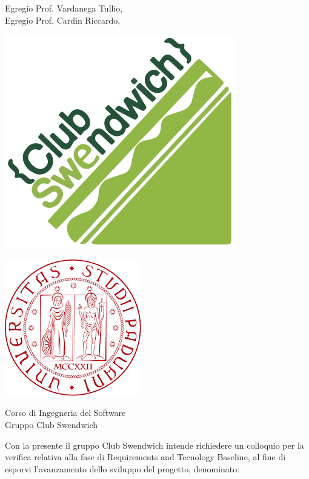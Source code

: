 \documentclass[a4paper, 12pt]{letter}
\begin{document}
    \begin{letter}
        { Egregio Prof. Vardanega Tullio,\\Egregio Prof. Cardin Riccardo,}
        \begin{minipage}{.4\textwidth}
            \begin{flushleft}
                \includegraphics[width=.55\textwidth]{../../assets/ClubSweLogo.png}
            \end{flushleft}
        \end{minipage}
        \begin{minipage}{.5\textwidth}
            \begin{flushright}
                \includegraphics[width=.4\linewidth]{../../assets/logoUnipd.png}
            \end{flushright}
        \end{minipage}
        {    
        \begin{flushleft}
            Corso di Ingegneria del Software\\ Gruppo Club Swendwich\\ 
        \end{flushleft}
        }
        \opening{ Con la presente il gruppo Club Swendwich intende richiedere un colloquio per la verifica relativa alla fase di Requirements and Tecnology Baseline, al fine di esporvi l'avanzamento dello sviluppo del progetto, denominato:}

\end{letter}
\end{document}
